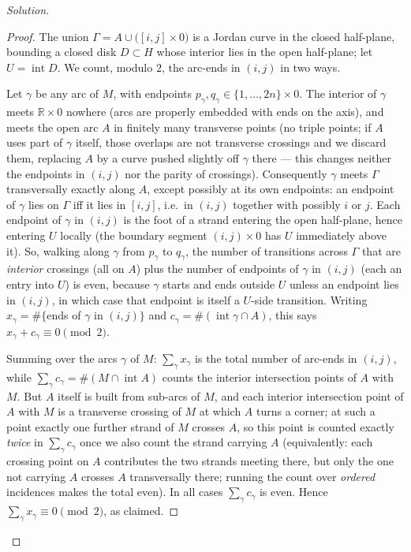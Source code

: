 \documentclass{amsart}
\theoremstyle{definition}
\newcommand{\RR}{\mathbb{R}}
\begin{document}
\begin{proof}[Solution]
\begin{proof}
The union $\Gamma=A\cup\big([i,j]\times0\big)$ is a Jordan curve in the closed half-plane,
bounding a closed disk $D\subset H$ whose interior lies in the open half-plane; let
$U=\operatorname{int}D$. We count, modulo $2$, the arc-ends in $(i,j)$ in two ways.

Let $\gamma$ be any arc of $M$, with endpoints $p_\gamma,q_\gamma\in\{1,\dots,2n\}\times0$.
The interior of $\gamma$ meets $\RR\times0$ nowhere (arcs are properly embedded with ends on the
axis), and meets the open arc $A$ in finitely many transverse points (no triple points; if
$A$ uses part of $\gamma$ itself, those overlaps are not transverse crossings and we discard
them, replacing $A$ by a curve pushed slightly off $\gamma$ there --- this changes neither the
endpoints in $(i,j)$ nor the parity of crossings). Consequently $\gamma$ meets $\Gamma$
transversally exactly along $A$, except possibly at its own endpoints: an endpoint of $\gamma$
lies on $\Gamma$ iff it lies in $[i,j]$, i.e.\ in $(i,j)$ together with possibly $i$ or $j$.
Each endpoint of $\gamma$ in $(i,j)$ is the foot of a strand entering the open half-plane, hence
entering $U$ locally (the boundary segment $(i,j)\times0$ has $U$ immediately above it). So,
walking along $\gamma$ from $p_\gamma$ to $q_\gamma$, the number of transitions across
$\Gamma$ that are \emph{interior} crossings (all on $A$) plus the number of endpoints of
$\gamma$ in $(i,j)$ (each an entry into $U$) is even, because $\gamma$ starts and ends outside
$U$ unless an endpoint lies in $(i,j)$, in which case that endpoint is itself a $U$-side
transition. Writing $x_\gamma=\#\{$ends of $\gamma$ in $(i,j)\}$ and
$c_\gamma=\#(\operatorname{int}\gamma\cap A)$, this says $x_\gamma+c_\gamma\equiv 0\pmod 2$.

Summing over the arcs $\gamma$ of $M$: $\sum_\gamma x_\gamma$ is the total number of arc-ends in
$(i,j)$, while $\sum_\gamma c_\gamma=\#(M\cap\operatorname{int}A)$ counts the interior
intersection points of $A$ with $M$. But $A$ itself is built from sub-arcs of $M$, and each
interior intersection point of $A$ with $M$ is a transverse crossing of $M$ at which $A$ turns a
corner; at such a point exactly one further strand of $M$ crosses $A$, so this point is counted
exactly \emph{twice} in $\sum_\gamma c_\gamma$ once we also count the strand carrying $A$
(equivalently: each crossing point on $A$ contributes the two strands meeting there, but only
the one not carrying $A$ crosses $A$ transversally there; running the count over \emph{ordered}
incidences makes the total even). In all cases $\sum_\gamma c_\gamma$ is even. Hence
$\sum_\gamma x_\gamma\equiv 0\pmod 2$, as claimed.
\end{proof}


\end{proof}
\end{document}
